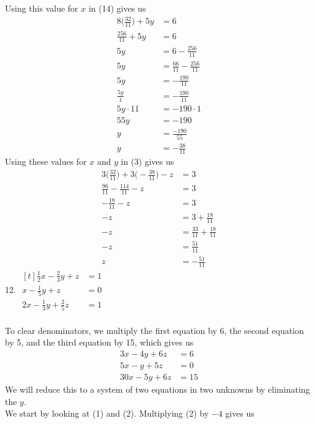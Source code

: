 \documentclass[12pt]{article}
\begin{document}
Using this value for $x$ in (14) gives us
\begin{align*}
8\bigg(\displaystyle \frac{32}{11}\bigg)+5y&=6 \\
\displaystyle \frac{256}{11}+5y&=6 \\
5y&=6-\displaystyle \frac{256}{11} \\
5y&=\displaystyle \frac{66}{11}-\displaystyle \frac{256}{11} \\
5y&=-\displaystyle \frac{190}{11} \\
\displaystyle \frac{5y}{1}&=-\displaystyle \frac{190}{11} \\
5y\cdot11&=-190\cdot1 \\
55y&=-190 \\
y&=\displaystyle \frac{-190}{55} \\
y&=-\displaystyle \frac{38}{11}
\end{align*}
Using these values for $x$ and $y$ in (3) gives us
\begin{align*}
3\bigg(\displaystyle \frac{32}{11}\bigg)+3\bigg(-\displaystyle \frac{38}{11}\bigg)-z&=3 \\
\displaystyle \frac{96}{11}-\displaystyle \frac{114}{11}-z&=3 \\
-\displaystyle \frac{18}{11}-z&=3 \\
-z&=3+\displaystyle \frac{18}{11} \\
-z&=\displaystyle \frac{33}{11}+\displaystyle \frac{18}{11} \\
-z&=\displaystyle \frac{51}{11} \\
z&=-\displaystyle \frac{51}{11}
\end{align*}
\setcounter{equation}{0}
12. $\begin{aligned}[t]
\frac{1}{2}x-\frac{2}{3}y+z&=1 \\
x-\frac{1}{5}y+z&=0 \\
2x-\frac{1}{3}y+\frac{2}{5}z&=1
\end{aligned}$ \\
\\
To clear denominators, we multiply the first equation by 6, the second equation by 5, and the third equation by 15, which gives us
\begin{align}
3x-4y+6z&=6 \\
5x-y+5z&=0 \\
30x-5y+6z&=15
\end{align}
We will reduce this to a system of two equations in two unknowns by eliminating the $y$. \\
We start by looking at (1) and (2). Multiplying (2) by $-4$ gives us
\end{document}
